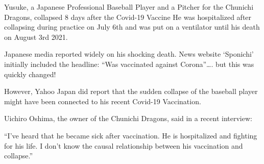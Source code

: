 Yusuke, a Japanese Professional Baseball Player and a Pitcher for the Chunichi
Dragons, collapsed 8 days after the Covid-19 Vaccine He was hospitalized after
collapsing during practice on July 6th and was put on a ventilator until his
death on August 3rd 2021.

Japanese media reported widely on his shocking death. News website ‘Sponichi’
initially included the headline: “Was vaccinated against Corona”…. but this was
quickly changed!

However, Yahoo Japan did report that the sudden collapse of the baseball player
might have been connected to his recent Covid-19 Vaccination.

Uichiro Oshima, the owner of the Chunichi Dragons, said in a recent interview:

“I’ve heard that he became sick after vaccination. He is hospitalized and
fighting for his life. I don’t know the causal relationship between his
vaccination and collapse.”
